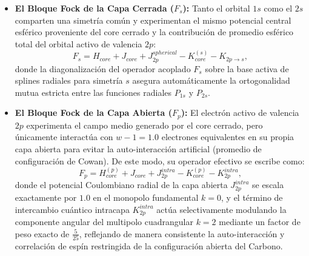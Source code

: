 \begin{itemize}
\item \textbf{El Bloque Fock de la Capa Cerrada (\(F_s\)):}
  Tanto el orbital \( 1s \) como el \( 2s \) comparten una simetría común y experimentan el mismo potencial central esférico proveniente del core cerrado y la contribución de promedio esférico total del orbital activo de valencia \( 2p \):
  \begin{equation}
    F_s = H_{core} + J_{core} + J_{2p}^{spherical} - K_{core}^{(s)} - K_{2p\to s},
  \end{equation}
  donde la diagonalización del operador acoplado \( F_s \) sobre la base activa de splines radiales para simetría \( s \) asegura automáticamente la ortogonalidad mutua estricta entre las funciones radiales \( P_{1s} \) y \( P_{2s} \).
  
\item \textbf{El Bloque Fock de la Capa Abierta (\(F_p\)):}
  El electrón activo de valencia \( 2p \) experimenta el campo medio generado por el core cerrado, pero únicamente interactúa con \( w-1 = 1.0 \) electrones equivalentes en su propia capa abierta para evitar la auto-interacción artificial (promedio de configuración de Cowan). De este modo, su operador efectivo se escribe como:
  \begin{equation}
    F_p = H_{core}^{(p)} + J_{core} + J_{2p}^{intra} - K_{core}^{(p)} - K_{2p}^{intra},
  \end{equation}
  donde el potencial Coulombiano radial de la capa abierta \( J_{2p}^{intra} \) se escala exactamente por \( 1.0 \) en el monopolo fundamental \( k=0 \), y el término de intercambio cuántico intracapa \( K_{2p}^{intra} \) actúa selectivamente modulando la componente angular del multipolo cuadrangular \( k=2 \) mediante un factor de peso exacto de \( \frac{5}{25} \), reflejando de manera consistente la auto-interacción y correlación de espín restringida de la configuración abierta del Carbono.
\end{itemize}
